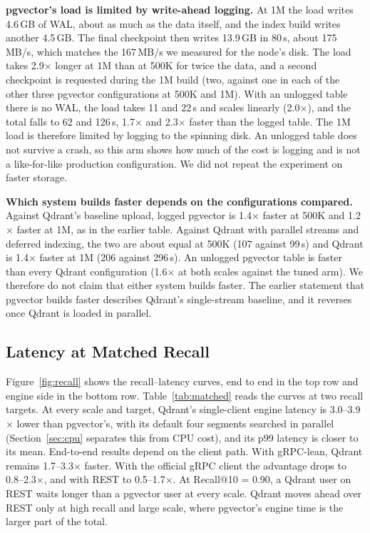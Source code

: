 \documentclass[preprint,12pt]{elsarticle}
\begin{document}
\textbf{pgvector's load is limited by write-ahead logging.} At 1M the load writes 4.6\,GB of
WAL, about as much as the data itself, and the index build writes another 4.5\,GB. The
final checkpoint then writes 13.9\,GB in 80\,s, about 175\,MB/s, which matches the
167\,MB/s we measured for the node's disk. The load takes 2.9$\times$ longer at 1M than at
500K for twice the data, and a second checkpoint is requested during the 1M build (two,
against one in each of the other three pgvector configurations at 500K and 1M). With an unlogged table there is no
WAL, the load takes 11 and 22\,s and scales linearly (2.0$\times$), and the total falls to
62 and 126\,s, 1.7$\times$ and 2.3$\times$ faster than the logged table. The 1M load is
therefore limited by logging to the spinning disk. An unlogged table does not survive a
crash, so this arm shows how much of the cost is logging and is not a like-for-like
production configuration. We did not repeat the experiment on faster storage.

\textbf{Which system builds faster depends on the configurations compared.} Against
Qdrant's baseline upload, logged pgvector is 1.4$\times$ faster at 500K and 1.2$\times$
faster at 1M, as in the earlier table. Against Qdrant with parallel streams and deferred
indexing, the two are about equal at 500K (107 against 99\,s) and Qdrant is 1.4$\times$
faster at 1M (206 against 296\,s). An unlogged pgvector table is faster than every Qdrant
configuration (1.6$\times$ at both scales against the tuned arm). We therefore do not claim
that either system builds faster. The earlier statement that pgvector builds faster
describes Qdrant's single-stream baseline, and it reverses once Qdrant is loaded in
parallel.

\subsection{Latency at Matched Recall}

Figure~\ref{fig:recall} shows the recall--latency curves, end to end in the top row and
engine side in the bottom row. Table~\ref{tab:matched} reads the curves at two recall
targets. At every scale and target, Qdrant's single-client engine latency is
3.0--3.9$\times$ lower than pgvector's, with its default four segments searched in
parallel (Section~\ref{sec:cpu} separates this from CPU cost), and its p99 latency is
closer to its mean. End-to-end results depend on the
client path. With gRPC-lean, Qdrant remains 1.7--3.3$\times$ faster. With the official
gRPC client the advantage drops to 0.8--2.3$\times$, and with REST to 0.5--1.7$\times$.
At Recall@10 = 0.90, a Qdrant user on REST waits longer than a pgvector user at every
scale. Qdrant moves ahead over REST only at high recall and large scale, where pgvector's
engine time is the larger part of the total.
\end{document}
